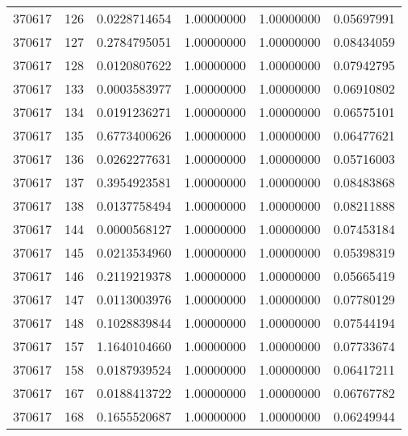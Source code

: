 \begin{table}[htp]
{{\begin{tabular}{cccccc}
                370617 & 126         & 0.0228714654         & 1.00000000   & 1.00000000        & 0.05697991\\
                370617 & 127         & 0.2784795051         & 1.00000000   & 1.00000000        & 0.08434059\\
                370617 & 128         & 0.0120807622         & 1.00000000   & 1.00000000        & 0.07942795\\
                370617 & 133         & 0.0003583977         & 1.00000000   & 1.00000000        & 0.06910802\\
                370617 & 134         & 0.0191236271         & 1.00000000   & 1.00000000        & 0.06575101\\
                370617 & 135         & 0.6773400626         & 1.00000000   & 1.00000000        & 0.06477621\\
                370617 & 136         & 0.0262277631         & 1.00000000   & 1.00000000        & 0.05716003\\
                370617 & 137         & 0.3954923581         & 1.00000000   & 1.00000000        & 0.08483868\\
                370617 & 138         & 0.0137758494         & 1.00000000   & 1.00000000        & 0.08211888\\
                370617 & 144         & 0.0000568127         & 1.00000000   & 1.00000000        & 0.07453184\\
                370617 & 145         & 0.0213534960         & 1.00000000   & 1.00000000        & 0.05398319\\
                370617 & 146         & 0.2119219378         & 1.00000000   & 1.00000000        & 0.05665419\\
                370617 & 147         & 0.0113003976         & 1.00000000   & 1.00000000        & 0.07780129\\
                370617 & 148         & 0.1028839844         & 1.00000000   & 1.00000000        & 0.07544194\\
                370617 & 157         & 1.1640104660         & 1.00000000   & 1.00000000        & 0.07733674\\
                370617 & 158         & 0.0187939524         & 1.00000000   & 1.00000000        & 0.06417211\\
                370617 & 167         & 0.0188413722         & 1.00000000   & 1.00000000        & 0.06767782\\
                370617 & 168         & 0.1655520687         & 1.00000000   & 1.00000000        & 0.06249944\\

\end{tabular}}}
\end{table}
